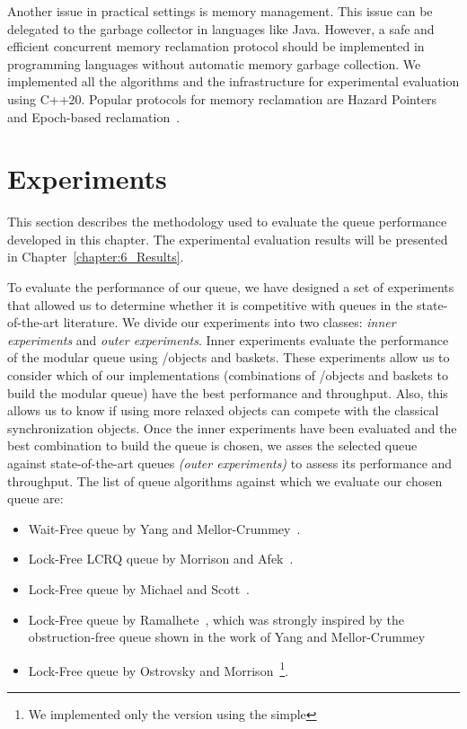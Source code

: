 Another issue in practical settings is memory management. This issue can be delegated to the garbage collector in languages like Java. However, a safe and efficient concurrent memory reclamation protocol should be implemented in programming languages without automatic memory garbage collection. We implemented all the algorithms and the infrastructure for experimental evaluation using C++20. Popular protocols for memory reclamation are Hazard Pointers~\cite{DBLP_conf_podc_Michael02} and Epoch-based reclamation~\cite{DBLP_phd_ethos_Fraser04,mckenney2001read}.




\section{\label{sec:queue-experiments}Experiments}

This section describes the methodology used to evaluate the queue performance developed in this chapter. The experimental evaluation results will be presented in Chapter~\ref{chapter:6_Results}.

To evaluate the performance of our queue, we have designed a set of experiments that allowed us to determine whether it is competitive with queues in the state-of-the-art literature.
We divide our experiments into two classes: \emph{inner experiments} and \emph{outer experiments}.
Inner experiments evaluate the performance of the modular queue using \LL/\IC objects and baskets. These experiments allow us to consider which of our implementations (combinations of \LL/\IC objects and baskets to build the modular queue) have the best performance and throughput. Also, this allows us to know if using more relaxed objects can compete with the classical synchronization objects. Once the inner experiments have been evaluated and the best combination to build the queue is chosen, we asses the selected queue against state-of-the-art queues \emph{(outer experiments)} to assess its performance and throughput. The list of queue 
algorithms against which we evaluate our chosen queue are:

\begin{itemize}
    \item Wait-Free queue by Yang and Mellor-Crummey~\cite{DBLP_conf_ppopp_YangM16}.
    \item Lock-Free LCRQ queue by Morrison and Afek~\cite{ppopp2013x86queues}.
    \item Lock-Free queue by Michael and Scott~\cite{DBLP_conf_podc_MichaelS96}.
    \item Lock-Free queue by Ramalhete~\cite{Ramalhete_Correia_MPMC_2016}, which was strongly inspired by the obstruction\hyp{}free queue shown in the work of Yang and Mellor-Crummey~\cite{DBLP_conf_ppopp_YangM16}
    \item Lock-Free queue by Ostrovsky and Morrison~\cite{scalingconcurrent2020}\footnote{We implemented only the version using the simple \CAS}.
\end{itemize}


